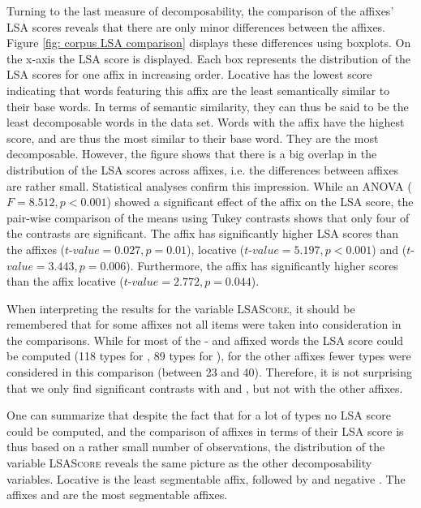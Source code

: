 Turning to the last measure of decomposability, the comparison of the affixes' LSA scores reveals that there are only minor differences between the affixes. Figure \ref{fig: corpus LSA comparison} displays these differences using boxplots. On the x-axis the LSA score is displayed. Each box represents the distribution of the LSA scores for one affix in increasing order. Locative  has the lowest score indicating that words featuring this affix are the least semantically similar to their base words. In terms of semantic similarity, they can thus be said to be the least decomposable words in the data set. Words with the affix  have the highest score, and are thus the most similar to their base word. They are the most decomposable.
However, the figure shows that there is a big overlap in the distribution of the LSA scores across affixes, i.e. the differences between affixes are rather small. Statistical analyses confirm this impression.
While an ANOVA ($F=8.512, p< 0.001$) showed a significant effect of the affix on the LSA score, the pair-wise comparison of the means using Tukey contrasts shows  that only four of the contrasts are significant. The affix  has significantly higher LSA scores than the affixes  ($t$-$value=0.027, p=0.01$), locative  ($t$-$value=5.197, p< 0.001$) and   ($t$-$value=3.443, p=0.006$). Furthermore, the affix  has significantly higher scores than the  affix locative  ($t$-$value=2.772, p=0.044$). 



        When interpreting the results for the variable \textsc{LSAScore}, it should be remembered that for some affixes not all items were taken into consideration in the comparisons. While for most of the - and affixed words the LSA score could be computed (118 types for , 89 types for ), for the other affixes fewer types were considered in this comparison (between 23 and 40). Therefore, it is not surprising that we only find significant contrasts with  and , but not with the other affixes.  
        
        One can summarize that despite the fact that for a lot of types no LSA score could be computed, and the comparison of affixes in terms of their LSA score is thus based on a rather small number of observations, the distribution of the variable \textsc{LSAScore} reveals the same picture as the other decomposability variables. Locative  is the least segmentable affix, followed by  and negative . The affixes  and  are the most segmentable affixes. 
        
